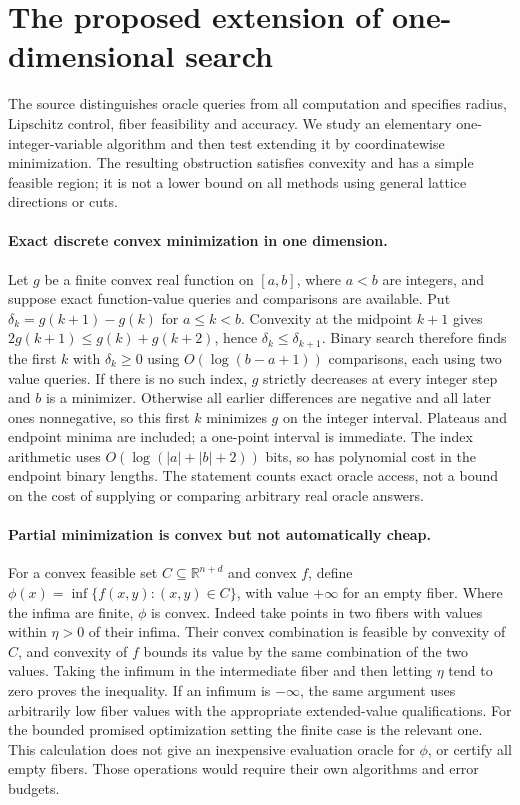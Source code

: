\documentclass[11pt]{article}
\begin{document}
\section{The proposed extension of one-dimensional search}
The source distinguishes oracle queries from all computation and
specifies radius, Lipschitz control, fiber feasibility and accuracy.
We study an elementary one-integer-variable algorithm and then test
extending it by coordinatewise minimization. The resulting obstruction
satisfies convexity and has a simple feasible region; it is not a
lower bound on all methods using general lattice directions or cuts.

\paragraph{Exact discrete convex minimization in one dimension.}
Let $g$ be a finite convex real function on $[a,b]$, where
$a<b$ are integers, and suppose exact function-value queries and
comparisons are available. Put $\delta_k=g(k+1)-g(k)$ for
$a\le k<b$. Convexity at the midpoint $k+1$ gives
$2g(k+1)\le g(k)+g(k+2)$, hence
$\delta_k\le\delta_{k+1}$. Binary search therefore finds
the first $k$ with $\delta_k\ge0$ using
$O(\log(b-a+1))$ comparisons, each using two value queries.
If there is no such index, $g$ strictly decreases at every
integer step and $b$ is a minimizer. Otherwise all earlier
differences are negative and all later ones nonnegative, so this
first $k$ minimizes $g$ on the integer interval. Plateaus and
endpoint minima are included; a one-point interval is immediate.
The index arithmetic uses $O(\log(|a|+|b|+2))$ bits,
so has polynomial cost in the endpoint binary lengths. The statement
counts exact oracle access, not a bound on the cost of supplying
or comparing arbitrary real oracle answers.

\paragraph{Partial minimization is convex but not automatically cheap.}
For a convex feasible set $C\subseteq\mathbb R^{n+d}$ and
convex $f$, define $\phi(x)=\inf\{f(x,y):(x,y)\in C\}$,
with value $+\infty$ for an empty fiber. Where the infima are
finite, $\phi$ is convex. Indeed take points in two fibers with
values within $\eta>0$ of their infima. Their convex combination
is feasible by convexity of $C$, and convexity of $f$ bounds
its value by the same combination of the two values. Taking the
infimum in the intermediate fiber and then letting $\eta$ tend
to zero proves the inequality. If an infimum is $-\infty$,
the same argument uses arbitrarily low fiber values with the
appropriate extended-value qualifications. For the bounded promised
optimization setting the finite case is the relevant one.
This calculation does not give an inexpensive evaluation oracle for
$\phi$, or certify all empty fibers. Those operations would require
their own algorithms and error budgets.
\end{document}
